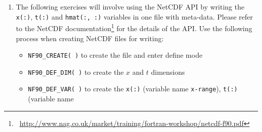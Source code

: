 \documentclass[12pt]{article}
\begin{document}
\begin{enumerate}
Run the FORD command \texttt{ford fmw.md} and then load the file \texttt{doc/index.html} in any Web browser
to browse the source code documentation by copying the directory \texttt{doc/} to your laptop. To copy
\texttt{doc/} in Linux, use the command from your laptop:
\begin{Verbatim}[commandchars=\\\{\}]
scp -r \textit{username}@fortran-training.hpc.cam.ac.uk:~/fmw_exercises/doc .
\end{Verbatim}
where \textit{username} is the username you have been provided. 
\begin{enumerate}
\item Click on \texttt{Program} tab (top right) which displays the module dependency graph as well as the call graph. The
  local variables and the source code is also displayed;
\item The text also contains the LaTeX equation:
\begin{equation}
\frac{\partial H}{\partial t} - \kappa\frac{\partial^{2} H}{\partial x^{2}} = f(x)
\end{equation}
\item Have a browse around the other links to familiarise yourself with Fortran Documenter;
\item After the workshop has ended, do the same for the remaining module files 
(i.e. \texttt{IO\_mod.f90}, \texttt{RHS\_mod.f90}, \texttt{Solver\_mod.f90}, \texttt{Types\_mod.f90})
\item Commit the changed files in Git:
\begin{verbatim}
git add fd1d_heat_explicit.f90 CFL_mod.f90 fmw.md
git commit -m "added FORD documentation in source code"
\end{verbatim}
\end{enumerate}
\item The following exercises will involve using the NetCDF API by writing the
  \texttt{x(:)}, \texttt{t(:)} and \texttt{hmat(:, :)} variables in one file with meta-data. 
Please refer to the NetCDF documentation\footnote{~\url{http://www.nag.co.uk/market/training/fortran-workshop/netcdf-f90.pdf}} for the details of the API. Use the following process when creating NetCDF files for writing:
\begin{itemize}
\item\texttt{NF90\_CREATE( )} to create the file and enter define mode
\item\texttt{NF90\_DEF\_DIM( )} to create the $x$ and $t$ dimensions
\item\texttt{NF90\_DEF\_VAR( )} to create the \texttt{x(:)} (variable name \texttt{x-range}), \texttt{t(:)} (variable name

\end{itemize}
\end{enumerate}
\end{document}

